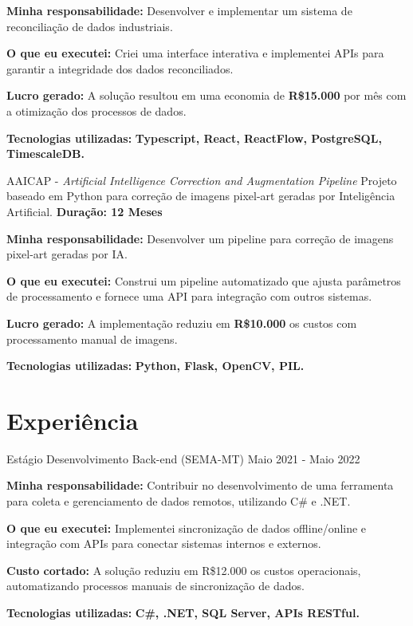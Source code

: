 \resumeItemListStart
\item \textbf{Minha responsabilidade:} Desenvolver e implementar um sistema de reconciliação de dados industriais.
\item \textbf{O que eu executei:} Criei uma interface interativa e implementei APIs para garantir a integridade dos dados reconciliados.
\item \textbf{Lucro gerado:} A solução resultou em uma economia de \textbf{R\$15.000} por mês com a otimização dos processos de dados.
\item \textbf{Tecnologias utilizadas:} \textbf{Typescript, React, ReactFlow, PostgreSQL, TimescaleDB.}
\resumeItemListEnd

\vspace{-2mm}

\resumeProject
{ AAICAP - \textit{Artificial Intelligence Correction and Augmentation Pipeline}}
{Projeto baseado em Python para correção de imagens pixel-art geradas por Inteligência Artificial.}
{\textbf{Duração: 12 Meses}}

\resumeItemListStart
\item \textbf{Minha responsabilidade:} Desenvolver um pipeline para correção de imagens pixel-art geradas por IA.
\item \textbf{O que eu executei:} Construi um pipeline automatizado que ajusta parâmetros de processamento e fornece uma API para integração com outros sistemas.
\item \textbf{Lucro gerado:} A implementação reduziu em \textbf{R\$10.000} os custos com processamento manual de imagens.
\item \textbf{Tecnologias utilizadas:} \textbf{Python, Flask, OpenCV, PIL.}
\resumeItemListEnd

\resumeSubHeadingListEnd
\vspace{-8.5mm}

\section{\textbf{Experiência}}
\resumeSubHeadingListStart
\resumeSubheading
{ Estágio Desenvolvimento Back-end (SEMA-MT)}{}
{}{Maio 2021 - Maio 2022}
\vspace{-2.0mm}
\resumeItemListStart
\item \textbf{Minha responsabilidade:} Contribuir no desenvolvimento de uma ferramenta para coleta e gerenciamento de dados remotos, utilizando C\# e .NET.
\item \textbf{O que eu executei:} Implementei sincronização de dados offline/online e integração com APIs para conectar sistemas internos e externos.
\item \textbf{Custo cortado:} A solução reduziu em R\$12.000 os custos operacionais, automatizando processos manuais de sincronização de dados.
\item \textbf{Tecnologias utilizadas:} \textbf{C\#, .NET, SQL Server, APIs RESTful.}
\resumeItemListEnd

